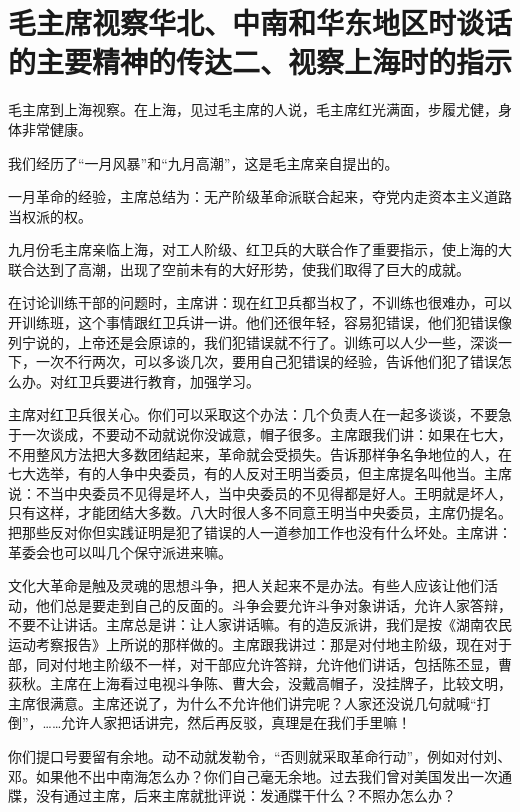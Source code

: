 \section[毛主席视察华北、中南和华东地区时谈话的主要精神的传达二、视察上海时的指示]{毛主席视察华北、中南和华东地区时谈话的主要精神的传达二、视察上海时的指示}


毛主席到上海视察。在上海，见过毛主席的人说，毛主席红光满面，步履尤健，身体非常健康。

我们经历了“一月风暴”和“九月高潮”，这是毛主席亲自提出的。

一月革命的经验，主席总结为：无产阶级革命派联合起来，夺党内走资本主义道路当权派的权。

九月份毛主席亲临上海，对工人阶级、红卫兵的大联合作了重要指示，使上海的大联合达到了高潮，出现了空前未有的大好形势，使我们取得了巨大的成就。


在讨论训练干部的问题时，主席讲：现在红卫兵都当权了，不训练也很难办，可以开训练班，这个事情跟红卫兵讲一讲。他们还很年轻，容易犯错误，他们犯错误像列宁说的，上帝还是会原谅的，我们犯错误就不行了。训练可以人少一些，深谈一下，一次不行两次，可以多谈几次，要用自己犯错误的经验，告诉他们犯了错误怎么办。对红卫兵要进行教育，加强学习。

主席对红卫兵很关心。你们可以采取这个办法：几个负责人在一起多谈谈，不要急于一次谈成，不要动不动就说你没诚意，帽子很多。主席跟我们讲：如果在七大，不用整风方法把大多数团结起来，革命就会受损失。告诉那样争名争地位的人，在七大选举，有的人争中央委员，有的人反对王明当委员，但主席提名叫他当。主席说：不当中央委员不见得是坏人，当中央委员的不见得都是好人。王明就是坏人，只有这样，才能团结大多数。八大时很人多不同意王明当中央委员，主席仍提名。把那些反对你但实践证明是犯了错误的人一道参加工作也没有什么坏处。主席讲：革委会也可以叫几个保守派进来嘛。

文化大革命是触及灵魂的思想斗争，把人关起来不是办法。有些人应该让他们活动，他们总是要走到自己的反面的。斗争会要允许斗争对象讲话，允许人家答辩，不要不让讲话。主席总是讲：让人家讲话嘛。有的造反派讲，我们是按《湖南农民运动考察报告》上所说的那样做的。主席跟我讲过：那是对付地主阶级，现在对于部，同对付地主阶级不一样，对干部应允许答辩，允许他们讲话，包括陈丕显，曹荻秋。主席在上海看过电视斗争陈、曹大会，没戴高帽子，没挂牌子，比较文明，主席很满意。主席还说了，为什么不允许他们讲完呢？人家还没说几句就喊“打倒”，……允许人家把话讲完，然后再反驳，真理是在我们手里嘛！

你们提口号要留有余地。动不动就发勒令，“否则就采取革命行动”，例如对付刘、邓。如果他不出中南海怎么办？你们自己毫无余地。过去我们曾对美国发出一次通牒，没有通过主席，后来主席就批评说：发通牒干什么？不照办怎么办？

